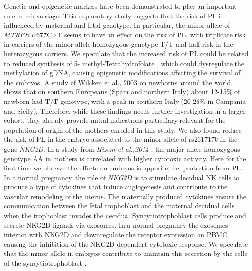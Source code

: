 \documentclass[10pt,letterpaper]{article}
\begin{document}
Genetic and epigenetic markers have been demonstrated to play an important role in miscarriage. This exploratory study suggests that the risk of PL is influenced by maternal and fetal genotype. In particular, the minor allele of \textit{MTHFR} c.677C>T seems to have an effect on the risk of PL, with triplicate risk in carriers of the minor allele homozygous genotype T/T and half risk in the heterozygous carriers. We speculate that the increased risk of PL could be related to reduced synthesis of 5- methyl-Tetrahydrofolate \cite{jacques1996relation}, which could dysregulate the methylation of gDNA, causing epigenetic modifications affecting the survival of the embryos. A study of Wilcken et al., 2003 \cite{wilcken2003geographical} on newborns around the world, shows that on southern Europeans (Spain and northern Italy) about 12-15\% of newborn had T/T genotype, with a peak in southern Italy (20-26\% in Campania and Sicily). 
\noindent Therefore, while these findings needs further investigation in a larger cohort, they already provide initial indications particulary relevant for the population of origin of the mothers enrolled in this study. 
\noindent We also found reduce the risk of PL in the embryo associated to the minor allele of rs2617170 in the gene \textit{NKG2D}. In a study from \textit{Hizem et al.,2014} \cite{hizem2014polymorphisms}, the major allele homozygous genotype AA in mothers is correlated with higher cytotoxic activity. Here for the first time we observe the effects on embryos is opposite, i.e. protection from PL. In a normal pregnancy, the role of \textit{NKG2D} is to stimulate decidual NK cells to produce a type of cytokines that induce angiogenesis and contribute to the vascular remodeling of the uterus. The maternally produced cytokines ensure the communication between the fetal trophoblast and the maternal decidual cells when the trophoblast invades the decidua. Syncytiotrophoblast cells produce and secrete NKG2D ligands via exosomes. In a normal pregnancy the exosomes interact with NKG2D and downregulate the receptor expression on PBMC causing the inhibition of the NKG2D-dependent cytotoxic response. We speculate that the minor allele in embryos contribute to maintain this secretion by the cells of the syncytiotrophoblast \cite{mei2012defects}. 
\end{document}
